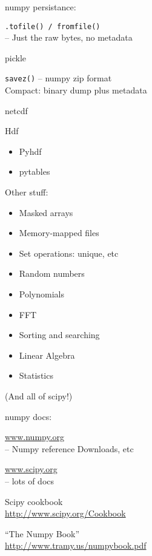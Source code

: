 \documentclass{beamer}
\begin{document}
\begin{frame}[fragile]{numpy persistance:}

{\Large \verb|.tofile() / fromfile()|}\\
 -- Just the raw bytes, no metadata

\vfill
{\Large pickle }

\vfill
{\Large \verb|savez()| -- numpy zip format}\\
Compact: binary dump plus metadata

\vfill
{\Large netcdf}

\vfill
{\Large Hdf}
\begin{itemize}
  \item Pyhdf
  \item pytables
\end{itemize}


\end{frame} 

\begin{frame}[fragile]{Other stuff:}

\begin{itemize}
  \item Masked arrays
  \item Memory-mapped files
  \item Set operations: unique, etc
  \item Random numbers
  \item Polynomials
  \item FFT
  \item Sorting and searching
  \item Linear Algebra
  \item Statistics
\end{itemize}

{\large (And all of scipy!)}

\end{frame} 

\begin{frame}[fragile]{numpy docs:}

\url{www.numpy.org}\\
   -- Numpy reference Downloads, etc

\vfill
\url{www.scipy.org}\\
   -- lots of docs

\vfill
{\large Scipy cookbook}\\
\url{http://www.scipy.org/Cookbook}

\vfill
{\large ``The Numpy Book''}\\
\url{http://www.tramy.us/numpybook.pdf}

\end{frame} 
\end{document}
